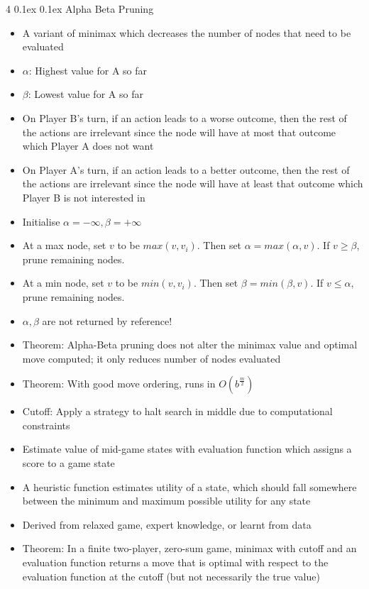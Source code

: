 \documentclass[10pt, landscape]{article}
\makeatletter
\renewcommand{\subsection}{\@startsection{subsection}{2}{0mm}%
  {0.1ex} %
  {0.1ex} %
  {\normalfont\normalsize\bfseries}}
\makeatother
\begin{document}
\begin{multicols*}{4}
\subsection{Alpha Beta Pruning}
\begin{itemize}
    \item A variant of minimax which decreases the number of nodes that need to be evaluated
    \item $\alpha$: Highest value for A so far
    \item $\beta$: Lowest value for A so far
    \item On Player B's turn, if an action leads to a worse outcome, then the rest of the actions are irrelevant since the node will have at most that outcome which Player A does not want
    \item On Player A's turn, if an action leads to a better outcome, then the rest of the actions are irrelevant since the node will have at least that outcome which Player B is not interested in
    \item Initialise $\alpha=-\infty, \beta=+\infty$
    \item At a max node, set $v$ to be $max(v, v_i)$. Then set $\alpha=max(\alpha, v)$. If $v \geq \beta$, prune remaining nodes.
    \item At a min node, set $v$ to be $min(v, v_i)$. Then set $\beta = min(\beta, v)$. If $v \leq \alpha$, prune remaining nodes.
    \item $\alpha, \beta$ are not returned by reference!
    \item Theorem: Alpha-Beta pruning does not alter the minimax value and optimal move computed; it only reduces number of nodes evaluated
    \item Theorem: With good move ordering, runs in $O(b^{\frac{m}{2}})$
    \item Cutoff: Apply a strategy to halt search in middle due to computational constraints
    \item Estimate value of mid-game states with evaluation function which assigns a score to a game state
    \item A heuristic function estimates utility of a state, which should fall somewhere between the minimum and maximum possible utility for any state
    \item Derived from relaxed game, expert knowledge, or learnt from data
    \item Theorem: In a finite two-player, zero-sum game, minimax with cutoff and an evaluation function returns a move that is optimal with respect to the evaluation function at the cutoff (but not necessarily the true value)
\end{itemize}


\end{multicols*}
\end{document}
